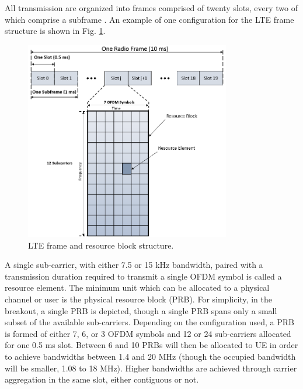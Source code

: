 All transmission are organized into frames comprised of twenty slots, every two of which comprise a subframe \cite{tr36211}. An example of one configuration for the LTE frame structure is shown in Fig. \ref{lte:frame}.
\begin{figure}[!t]
	\centering
	\includegraphics[width=0.8\textwidth]{figures3/LTE-frame}
	\caption{LTE frame and resource block structure.}
	\label{lte:frame}
\end{figure}
A single sub-carrier, with either 7.5 or 15 kHz bandwidth, paired with a transmission duration required to transmit a single OFDM symbol is called a resource element.  The minimum unit which can be allocated to a physical channel or user is the physical resource block (PRB).  For simplicity, in the breakout, a single PRB is depicted, though a single PRB spans only a small subset of the available sub-carriers. Depending on the configuration used, a PRB is formed of either 7, 6, or 3 OFDM symbols and 12 or 24 sub-carriers allocated for one 0.5 ms slot.  Between 6 and 10 PRBs will then be allocated to UE in order to achieve bandwidths between 1.4 and 20 MHz (though the occupied bandwidth will be smaller, 1.08 to 18 MHz).  Higher bandwidths are achieved through carrier aggregation in the same slot, either contiguous or not. 

